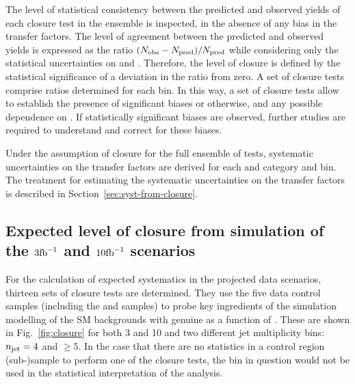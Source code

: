 The level of statistical consistency between the predicted and
observed yields of each closure test in the ensemble is inspected, in
the absence of any bias in the transfer factors. The level of
agreement between the predicted and observed yields is expressed as
the ratio $(\nobs - \npre)/\npre$ while considering only the
statistical uncertainties on \npre and \nobs. Therefore, the level of
closure is defined by the statistical significance of a deviation in
the ratio from zero. A set of closure tests comprise ratios determined
for each \scalht bin. In this way, a set of closure tests allow to
establish the presence of significant biases or otherwise, and any
possible dependence on \scalht. If statistically significant biases
are observed, further studies are required to understand and correct
for these biases.

Under the assumption of closure for the full ensemble of tests,
systematic uncertainties on the transfer factors are derived for each
\njet and \nb category and \scalht bin. The treatment for
estimating the systematic uncertainties on the transfer factors is
described in Section~\ref{sec:syst-from-closure}.

\subsection{Expected level of closure from simulation of the $3\ifb$
and $10\ifb$ scenarios}
\label{sec:closure-mc-study}

For the calculation of expected systematics in the projected data scenarios, 
thirteen sets of closure tests are
determined. They use the five data control samples (including the \ej
and \eej samples) to
probe key ingredients of the simulation modelling of the SM
backgrounds with genuine \met as a function of \scalht. These are
shown in Fig.~\ref{fig:closure} for both 3 \ifb and 10 \ifb and two
different jet multiplicity bins: $\njet = 4$ and $\geq 5$. 
In the case that there are no statistics in a control region (sub-)sample
to perform one of the closure tests, the bin in question would not be 
used in the statistical interpretation of the analysis.

